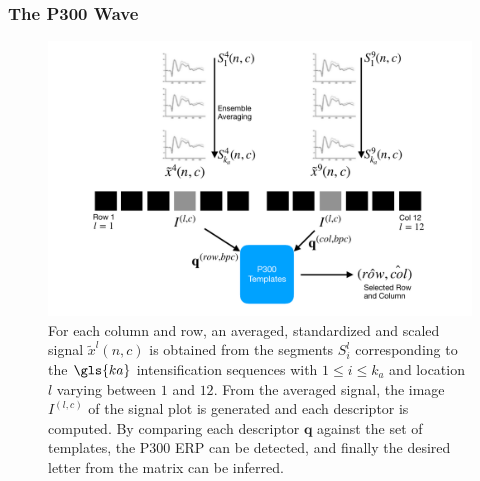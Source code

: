 \documentclass[aspectratio=169]{beamer}
\begin{document}
\begin{frame}
\frametitle{The P300 Wave}
\begin{center}
\begin{figure}[htb]
\centering
\includegraphics[scale=0.3]{images/classificationgraph.pdf}
\caption[P300 Speller Matrix Letter Identification]{For each column and row, an averaged, standardized and scaled signal $\tilde{x}^l(n,c)$ is obtained from the segments $S_i^l$  corresponding to the $\gls{ka}$ intensification sequences with $ 1 \leq i \leq k_a $ and location $l$ varying between $1$ and $12$. From the averaged signal, the image $I^{(l,c)}$ of the signal plot is generated and each descriptor is computed.  By comparing each descriptor $\mathbf{q}$  against the set of templates, the P300 ERP can be detected, and finally the desired letter from the matrix can be inferred.}
\label{fig:classification}
\end{figure}
\end{center}
\end{frame}     
\end{document}
